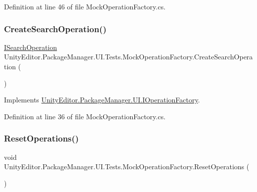 Definition at line 46 of file Mock\+Operation\+Factory.\+cs.

\mbox{\label{class_unity_editor_1_1_package_manager_1_1_u_i_1_1_tests_1_1_mock_operation_factory_ac6f6ae337cc8eafb8726dcf7b697cdbe}} 
\subsubsection{\texorpdfstring{CreateSearchOperation()}{CreateSearchOperation()}}
{\footnotesize\ttfamily \mbox{\hyperlink{interface_unity_editor_1_1_package_manager_1_1_u_i_1_1_i_search_operation}{I\+Search\+Operation}} Unity\+Editor.\+Package\+Manager.\+U\+I.\+Tests.\+Mock\+Operation\+Factory.\+Create\+Search\+Operation (\begin{DoxyParamCaption}{ }\end{DoxyParamCaption})}



Implements \mbox{\hyperlink{interface_unity_editor_1_1_package_manager_1_1_u_i_1_1_i_operation_factory_a1e4b0e667c493749785f3444697e59ce}{Unity\+Editor.\+Package\+Manager.\+U\+I.\+I\+Operation\+Factory}}.



Definition at line 36 of file Mock\+Operation\+Factory.\+cs.

\mbox{\label{class_unity_editor_1_1_package_manager_1_1_u_i_1_1_tests_1_1_mock_operation_factory_a9f58ffa587113492f7124ae4e2974028}} 
\subsubsection{\texorpdfstring{ResetOperations()}{ResetOperations()}}
{\footnotesize\ttfamily void Unity\+Editor.\+Package\+Manager.\+U\+I.\+Tests.\+Mock\+Operation\+Factory.\+Reset\+Operations (\begin{DoxyParamCaption}{ }\end{DoxyParamCaption})}



